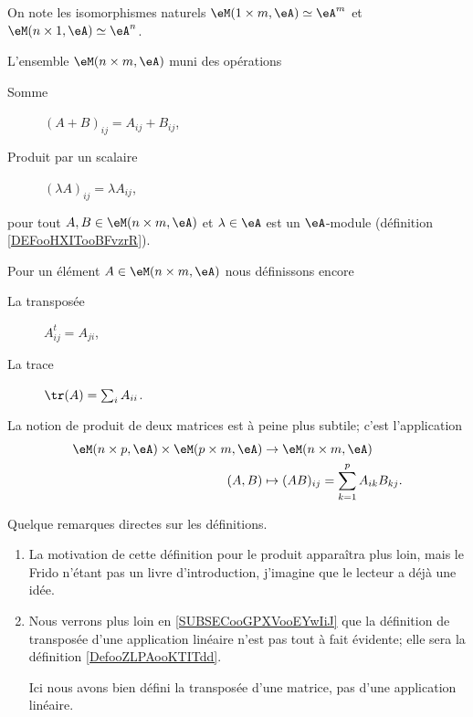 \begin{normaltext}
    On note les isomorphismes naturels \( \eM(1\times m,\eA) \simeq \eA^m\) et \( \eM(n\times 1,\eA) \simeq \eA^n\).
\end{normaltext}

\begin{lemmaDef}
    L'ensemble \( \eM(n\times m, \eA)\) muni des opérations
    \begin{description}
        \item[Somme] \( (A+B)_{ij}=A_{ij}+B_{ij}\),
        \item[Produit par un scalaire] \( (\lambda A)_{ij}=\lambda A_{ij}\),
    \end{description}
    pour tout \( A,B\in \eM(n\times m,\eA ) \) et \( \lambda\in \eA \) est un \( \eA\)-module (définition \ref{DEFooHXITooBFvzrR}).
\end{lemmaDef}

\begin{definition}
    Pour un élément \( A\in \eM(n\times m, \eA)\) nous définissons encore
    \begin{description}
        \item[La transposée] \( A^t_{ij}=A_{ji}\),
        \item[La trace] \( \tr(A)=\sum_iA_{ii}\).
    \end{description}
    La notion de produit de deux matrices est à peine plus subtile; c'est l'application
    \begin{equation}
        \begin{aligned}
             \eM(n\times p,\eA)\times \eM(p\times m,\eA)&\to \eM(n\times m,\eA) \\
             (A,B)&\mapsto (AB)_{ij}=\sum_{k=1}^pA_{ik}B_{kj}.
        \end{aligned}
    \end{equation}
\end{definition}

\begin{remark}
    Quelque remarques directes sur les définitions.
    \begin{enumerate}
        \item
            La motivation de cette définition pour le produit apparaîtra plus loin, mais le Frido n'étant pas un livre d'introduction, j'imagine que le lecteur a déjà une idée.
        \item
            Nous verrons plus loin en \ref{SUBSECooGPXVooEYwIiJ} que la définition de transposée d'une application linéaire n'est pas tout à fait évidente; elle sera la définition \ref{DefooZLPAooKTITdd}.

            Ici nous avons bien défini la transposée d'une matrice, pas d'une application linéaire.
    \end{enumerate}
\end{remark}


